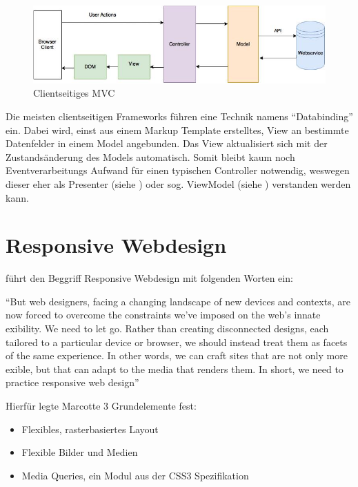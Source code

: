 \begin{figure}[htp]     %
\centering
\includegraphics[width=1.0\textwidth]{images/client_side_mvc} 
\caption{Clientseitiges MVC}\label{fig:client_side_mvc}
\end{figure}

Die meisten clientseitigen Frameworks führen eine Technik namens ``Databinding'' ein. Dabei wird, einst aus einem Markup Template erstelltes, View an bestimmte Datenfelder in einem Model angebunden. Das View aktualisiert sich mit der Zustandsänderung des Models automatisch. Somit bleibt kaum noch Eventverarbeitungs Aufwand für einen typischen Controller notwendig, weswegen dieser eher als Presenter (siehe \cite{MSDN:2016:MVP}) oder sog. ViewModel (siehe \cite{MSDN:2016:MVVM}) verstanden werden kann.


\section{Responsive Webdesign}

\cite[S.8]{Marcotte:2011} führt den Beggriff Responsive Webdesign mit folgenden Worten ein:

\enquote{But web designers, facing a changing landscape of new devices and contexts, are now forced to overcome the constraints we’ve imposed on the web’s innate  exibility.
We need to let go.
Rather than creating disconnected designs, each tailored to a particular device or browser, we should instead treat them as facets of the same experience. In other words, we can craft sites that are not only more  exible, but that can adapt to the media that renders them.
In short, we need to practice responsive web design}

Hierfür legte Marcotte 3 Grundelemente fest:

\begin{itemize}
 \item Flexibles, rasterbasiertes Layout
 \item Flexible Bilder und Medien
 \item Media Queries, ein Modul aus der CSS3 Spezifikation
\end{itemize}

